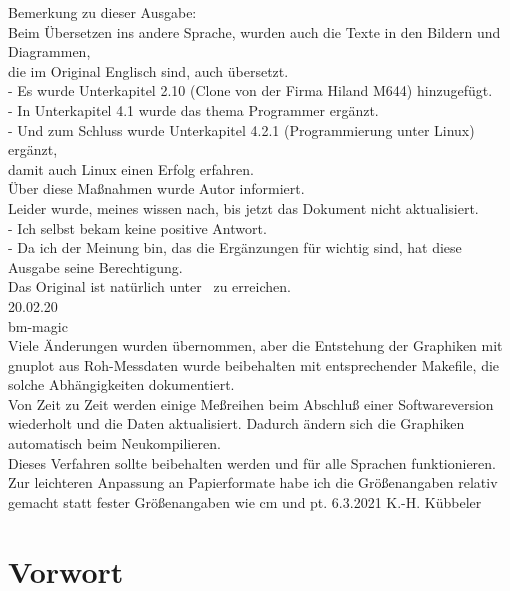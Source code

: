 Bemerkung zu dieser Ausgabe:
\vspace*{0.3cm}
\\Beim Übersetzen ins andere Sprache, wurden auch die Texte in den Bildern und Diagrammen,
\\die im Original Englisch sind, auch übersetzt.
\\- Es wurde Unterkapitel 2.10 (Clone von der Firma Hiland M644) hinzugefügt.
\\- In Unterkapitel 4.1 wurde das thema Programmer ergänzt.
\\- Und zum Schluss wurde Unterkapitel 4.2.1 (Programmierung unter Linux) ergänzt,
\\damit auch Linux  einen Erfolg erfahren.
\vspace*{0.3cm}
\\Über diese Maßnahmen wurde Autor informiert.
\\Leider wurde, meines wissen nach, bis jetzt das Dokument nicht aktualisiert.
\\- Ich selbst bekam keine positive Antwort.
\\- Da ich der Meinung bin, das die Ergänzungen für  wichtig sind, hat diese Ausgabe seine Berechtigung.
\vspace*{0.3cm}
\\Das Original ist natürlich unter~\cite{khk} zu erreichen.
\vspace*{0.2cm}
\\20.02.20
\\ bm-magic \\

Viele Änderungen wurden übernommen, aber die Entstehung der Graphiken mit gnuplot aus Roh-Messdaten
wurde beibehalten mit entsprechender Makefile, die solche Abhängigkeiten dokumentiert.\\
Von Zeit zu Zeit werden einige Meßreihen beim Abschluß einer Softwareversion wiederholt und
die Daten aktualisiert. Dadurch ändern sich die Graphiken automatisch beim Neukompilieren.\\
Dieses Verfahren sollte beibehalten werden und für alle Sprachen funktionieren.\\
Zur leichteren Anpassung an Papierformate habe ich die Größenangaben relativ gemacht statt
fester Größenangaben wie cm und pt.
\vspace*{0.2cm}
6.3.2021
K.-H. Kübbeler




\newpage
\section*{Vorwort}


